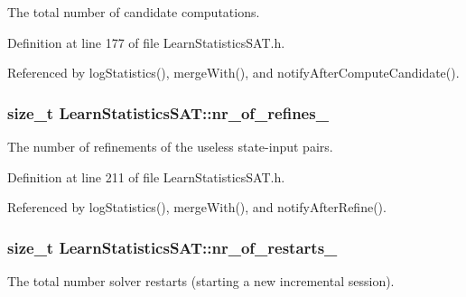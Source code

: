 The total number of candidate computations. 



Definition at line 177 of file Learn\-Statistics\-S\-A\-T.\-h.



Referenced by log\-Statistics(), merge\-With(), and notify\-After\-Compute\-Candidate().

\hypertarget{classLearnStatisticsSAT_afa9b3c4bb24e7f6ebd9593dfb916c11e}{
\subsubsection[{nr\-\_\-of\-\_\-refines\-\_\-}]{\setlength{\rightskip}{0pt plus 5cm}size\-\_\-t Learn\-Statistics\-S\-A\-T\-::nr\-\_\-of\-\_\-refines\-\_\-\hspace{0.3cm}{\ttfamily [protected]}}}\label{classLearnStatisticsSAT_afa9b3c4bb24e7f6ebd9593dfb916c11e}


The number of refinements of the useless state-\/input pairs. 



Definition at line 211 of file Learn\-Statistics\-S\-A\-T.\-h.



Referenced by log\-Statistics(), merge\-With(), and notify\-After\-Refine().

\hypertarget{classLearnStatisticsSAT_a07c8eee4a3c82762e3a94e38440f3adb}{
\subsubsection[{nr\-\_\-of\-\_\-restarts\-\_\-}]{\setlength{\rightskip}{0pt plus 5cm}size\-\_\-t Learn\-Statistics\-S\-A\-T\-::nr\-\_\-of\-\_\-restarts\-\_\-\hspace{0.3cm}{\ttfamily [protected]}}}\label{classLearnStatisticsSAT_a07c8eee4a3c82762e3a94e38440f3adb}


The total number solver restarts (starting a new incremental session). 



